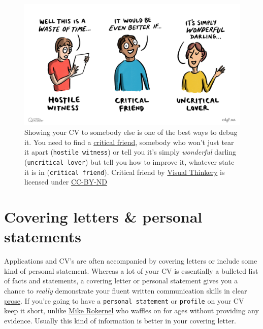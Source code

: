 \documentclass[
]{book}
\begin{document}
\begin{figure}

{\centering \includegraphics[width=1\linewidth]{images/Critical Friend} 

}

\caption{Showing your CV to somebody else is one of the best ways to debug it. You need to find a \href{https://en.wikipedia.org/wiki/Critical_friend}{critical friend}, somebody who won't just tear it apart (\texttt{hostile\ witness}) or tell you it's simply \emph{wonderful} darling (\texttt{uncritical\ lover}) but tell you how to improve it, whatever state it is in (\texttt{critical\ friend}). Critical friend by \href{https://visualthinkery.com/}{Visual Thinkery} is licensed under \href{https://creativecommons.org/licenses/by-nd/4.0/}{CC-BY-ND}}\label{fig:wonderfuldarling-fig}
\end{figure}



\hypertarget{we3qs}{%
\section{Covering letters \& personal statements}\label{we3qs}}

Applications and CV's are often accompanied by covering letters or include some kind of personal statement. Whereas a lot of your CV is essentially a bulleted list of facts and statements, a covering letter or personal statement gives you a chance to \emph{really} demonstrate your fluent written communication skills in clear \href{https://en.wikipedia.org/wiki/Prose}{prose}. If you're going to have a \texttt{personal\ statement} or \texttt{profile} on your CV keep it short, unlike \href{https://www.cdyf.me/mike_rokernel.pdf}{Mike Rokernel} who waffles on for ages without providing any evidence. Usually this kind of information is better in your covering letter.
\end{document}
